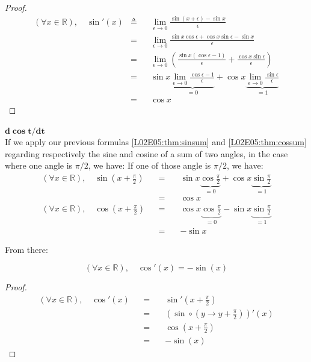 \documentclass[solutions.tex]{subfiles}
\begin{document}
\begin{proof}
\begin{equation*} \begin{aligned}
	(\forall x \in\mathbb{R}),\quad\sin'(x) &\triangleq&& \lim_{\epsilon \rightarrow 0}
		\frac{\sin(x+\epsilon)-\sin x}{\epsilon} \\
	~ &=&& \lim_{\epsilon \rightarrow 0}
		\frac{\sin x\cos\epsilon+\cos x\sin\epsilon-\sin x}{\epsilon} \\
	~ &=&& \lim_{\epsilon \rightarrow 0}\left(
		\frac{\sin x(\cos\epsilon-1)}{\epsilon}+\frac{\cos x\sin\epsilon}{\epsilon}
		\right) \\
	~ &=&& \sin x\underbrace{
			\lim_{\epsilon \rightarrow 0}\frac{\cos\epsilon-1}{\epsilon}
		}_{=0}
		+\cos x\underbrace{
			\lim_{\epsilon\rightarrow 0}\frac{\sin\epsilon}{\epsilon}
		}_{=1} \\
	~ &=&& \boxed{\cos x}
\end{aligned} \end{equation*}
\end{proof}
\hr
$\bm{d\cos t/dt}$\,\\
If we apply our previous formulas \eqref{L02E05:thm:sinsum} and
\eqref{L02E05:thm:cossum} regarding respectively the sine and
cosine of a sum of two angles, in the case where one angle is
$\pi/2$, we have:
If one of those angle is $\pi/2$, we have:
\begin{equation*} \begin{aligned}
	(\forall x\in\mathbb{R}),\quad \sin(x+\frac{\pi}2) &&=\quad&
		\sin x\underbrace{\cos\frac{\pi}{2}}_{=0}
		+\cos x\underbrace{\sin \frac{\pi}{2}}_{=1} \\
	~ &&=\quad& \boxed{\cos x} \\
	(\forall x\in\mathbb{R}),\quad \cos(x+\frac{\pi}2) &&=\quad&
		\cos x\underbrace{\cos\frac{\pi}{2}}_{=0}
		-\sin x\underbrace{\sin \frac{\pi}{2}}_{=1} \\
	~ &&=\quad& \boxed{-\sin x}
\end{aligned} \end{equation*}

From there:
\begin{theorem}
\[
	(\forall x\in\mathbb{R}),\quad \boxed{\cos'(x) = -\sin(x)}
\]
\end{theorem}
\begin{proof}
\begin{equation*} \begin{aligned}
	(\forall x\in\mathbb{R}),\quad \cos'(x) &&=\quad&
		\sin'(x+\frac\pi2) \\
	~ &&=\quad& (\sin\circ(y \rightarrow y+\frac\pi2))'(x) \\
	~ &&=\quad& \cos(x+\frac\pi2) \\
	~ &&=\quad& \boxed{-\sin(x)}
\end{aligned} \end{equation*}
\end{proof}
\end{document}
